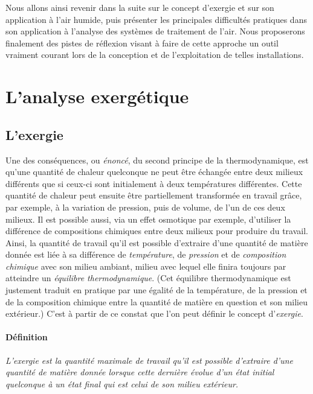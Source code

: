 \documentclass[a4paper,11pt]{scrartcl}
\begin{document}
Nous allons ainsi revenir dans la suite sur le concept d'exergie et sur son application à l'air humide, puis présenter les principales difficultés pratiques dans son application à l'analyse des systèmes de traitement de l'air. Nous proposerons finalement des pistes de réflexion visant à faire de cette approche un outil vraiment courant lors de la conception et de l'exploitation de telles installations.

\section{L'analyse exergétique}

\subsection{L'exergie} Une des conséquences, ou \emph{énoncé}, du second
principe de la thermodynamique, est qu'une quantité de chaleur quelconque ne
peut être échangée entre deux milieux différents que si ceux-ci sont
initialement à deux températures différentes. Cette quantité de chaleur peut
ensuite être partiellement transformée en travail grâce, par exemple, à la
variation de pression, puis de volume, de l'un de ces deux milieux. Il est
possible aussi, via un effet osmotique par exemple, d'utiliser la différence de
compositions chimiques entre deux milieux pour produire du travail. Ainsi, la
quantité de travail qu'il est possible d'extraire d'une quantité de
matière donnée est liée à sa différence de \emph{température}, de \emph{pression} et de
\emph{composition chimique} avec son milieu ambiant, milieu avec lequel elle
finira toujours par atteindre un \emph{équilibre thermodynamique}. (Cet
équilibre thermodynamique est justement traduit en pratique par une égalité de
la température, de la pression et de la composition chimique entre la quantité
de matière en question et son milieu extérieur.) C'est à partir de ce constat
que l'on peut définir le concept d'\emph{exergie}.

\paragraph{Définition} \textsl{L'exergie est la quantité maximale de travail
qu'il est possible d'extraire d'une quantité de matière donnée lorsque cette
dernière évolue d'un état initial quelconque à un état final qui est celui de
son milieu extérieur.}

\bigskip
\end{document}
